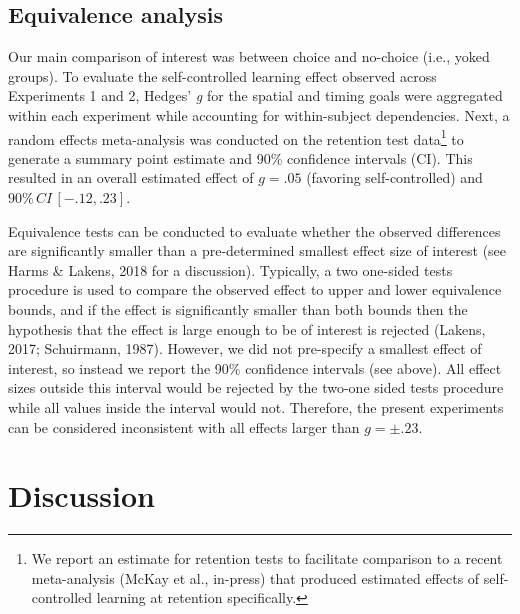 \documentclass[
  doc, donotrepeattitle,floatsintext]{apa7}
\begin{document}
\hypertarget{equivalence-analysis}{%
\subsection{Equivalence analysis}\label{equivalence-analysis}}

Our main comparison of interest was between choice and no-choice (i.e., yoked groups). To evaluate the self-controlled learning effect observed across Experiments 1 and 2, Hedges' \emph{g} for the spatial and timing goals were aggregated within each experiment while accounting for within-subject dependencies. Next, a random effects meta-analysis was conducted on the retention test data\footnote{We report an estimate for retention tests to facilitate comparison to a recent meta-analysis (McKay et al., in-press) that produced estimated effects of self-controlled learning at retention specifically.} to generate a summary point estimate and 90\% confidence intervals (CI). This resulted in an overall estimated effect of \(g = .05\) (favoring self-controlled) and \(90\% \,CI \,[-.12,.23]\).

Equivalence tests can be conducted to evaluate whether the observed differences are significantly smaller than a pre-determined smallest effect size of interest (see Harms \& Lakens, 2018 for a discussion). Typically, a two one-sided tests procedure is used to compare the observed effect to upper and lower equivalence bounds, and if the effect is significantly smaller than both bounds then the hypothesis that the effect is large enough to be of interest is rejected (Lakens, 2017; Schuirmann, 1987). However, we did not pre-specify a smallest effect of interest, so instead we report the 90\% confidence intervals (see above). All effect sizes outside this interval would be rejected by the two-one sided tests procedure while all values inside the interval would not. Therefore, the present experiments can be considered inconsistent with all effects larger than \(g = \pm.23\).

\hypertarget{discussion}{%
\section{Discussion}\label{discussion}}
\end{document}
